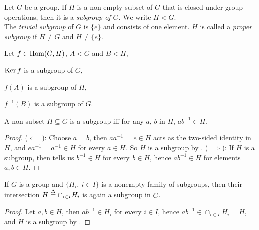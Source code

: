 \documentclass[../main-manifolds.tex]{subfiles}
\begin{document}
\begin{definition}[Subgroup {$H< G$}]\label{hungerford-chp1:subgroup-definition}
    Let $G$ be a group. If $H$ is a non-empty subset of $G$ that is closed under group operations, then it is a \emph{subgroup of $G$}. We write $H<G$.\\

    The \emph{trivial subgroup} of $G$ is $\{e\}$ and consists of one element. $H$ is called a \emph{proper subgroup} if $H\neq G$ and $H\neq \{e\}$.
\end{definition}

\begin{wts}\label{hungerford-chp1:exercise9}
    Let $f\in\Hom[G,H]$, $A<G$ and $B<H$,
    \begin{enumroman}
        \item $\operatorname{Ker}{f}$ is a subgroup of $G$,
        \item $f(A)$ is a subgroup of $H$,
        \item $f^{-1}(B)$ is a subgroup of $G$.
    \end{enumroman}
\end{wts}


\begin{wts}\label{hungerford-chp1:theorem2.5}
    A non-subset $H\subseteq G$ is a subgroup iff for any $a$, $b$ in $H$, $ab^{-1}\in H$.
\end{wts}
\begin{proof}
    ($\impliedby$): Choose $a=b$, then $aa^{-1}=e\in H$ acts as the two-sided identity in $H$, and $ea^{-1}=a^{-1}\in H$ for every $a\in H$. So $H$ is a subgroup by . ($\implies$): If $H$ is a subgroup, then  tells us $b^{-1}\in H$ for every $b\in H$, hence $ab^{-1}\in H$ for elements $a,b\in H$.
\end{proof}
\begin{corollary}\label{hungerford-chp1:corollary2.6}
    If $G$ is a group and $\{H_i,\: i\in I\}$ is a nonempty family of subgroups, then their intersection $H\overset{\Delta}{=} \cap_{i\in I}H_i$ is again a subgroup in $G$.
\end{corollary}
\begin{proof}
    Let $a,b\in H$, then $ab^{-1}\in H_i$ for every $i\in I$, hence $ab^{-1}\in \cap_{i\in I}H_i=H$, and $H$ is a subgroup by .
\end{proof}
\end{document}
